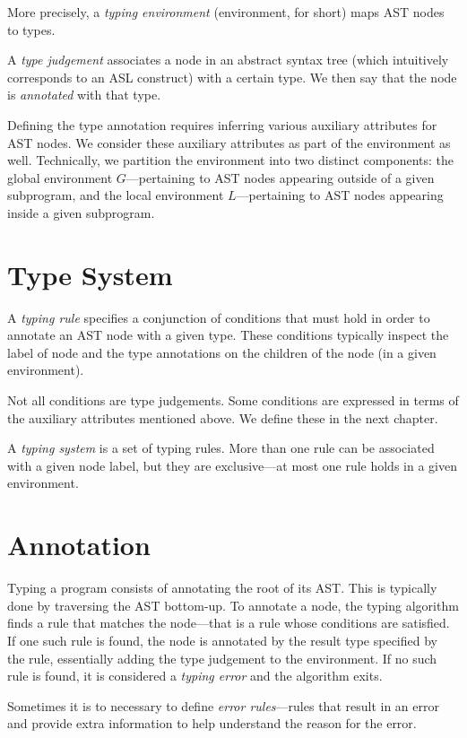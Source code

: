 \documentclass{book}
\begin{document}
More precisely, a \emph{typing environment} (environment, for short) maps AST
nodes to types.

A \emph{type judgement} associates a node in an abstract syntax tree (which
intuitively corresponds to an ASL construct) with a certain type. We then say
that the node is \emph{annotated} with that type.
%

Defining the type annotation requires inferring various auxiliary attributes
for AST nodes. We consider these auxiliary attributes as part of the
environment as well. Technically, we partition the environment into two
distinct components: the global environment $G$---pertaining to AST nodes
appearing outside of a given subprogram, and the local environment
$L$---pertaining to AST nodes appearing inside a given subprogram.

\section{Type System}
A \emph{typing rule} specifies a conjunction of conditions that must hold in
order to annotate an AST node with a given type. These conditions typically
inspect the label of node and the type annotations on the children of the node
(in a given environment).

Not all conditions are type judgements. Some conditions are expressed in terms
of the auxiliary attributes mentioned above. We define these in the next
chapter. 

A \emph{typing system} is a set of typing rules. More than one rule can be
associated with a given node label, but they are exclusive---at most one rule
holds in a given environment.

\section{Annotation}
Typing a program consists of annotating the root of its AST. This is typically
done by traversing the AST bottom-up.  To annotate a node, the typing algorithm
finds a rule that matches the node---that is a rule whose conditions are
satisfied. If one such rule is found, the node is annotated by the  result type
specified by the rule, essentially adding the type judgement to the
environment.  If no such rule is found, it is considered a \emph{typing error}
and the algorithm exits.

Sometimes it is to necessary to define \emph{error rules}---rules that result
in an error and provide extra information to help understand the reason for the
error.
\end{document}
